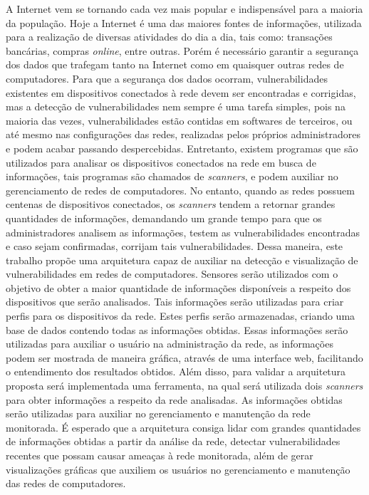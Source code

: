 \begin{resumo}

A Internet vem se tornando cada vez mais popular e indispensável para a maioria da população. Hoje a Internet é uma das maiores fontes de informações, utilizada para a realização de diversas atividades do dia a dia, tais como: transações bancárias, compras \textit{online}, entre outras. Porém  é necessário garantir a segurança dos dados que trafegam tanto na Internet como em quaisquer outras redes de computadores. Para que a segurança dos dados ocorram, vulnerabilidades existentes em dispositivos  conectados à rede devem ser encontradas e corrigidas, mas a detecção de vulnerabilidades nem sempre é uma tarefa simples, pois na maioria das vezes, vulnerabilidades estão contidas em softwares de terceiros, ou até mesmo nas configurações das redes, realizadas pelos próprios administradores e podem acabar passando despercebidas. Entretanto, existem programas que são utilizados para analisar os dispositivos conectados na rede em busca de informações, tais programas são chamados de \textit{scanners}, e podem auxiliar no gerenciamento de redes de computadores. No entanto, quando as redes possuem centenas de dispositivos conectados, os \textit{scanners} tendem a retornar grandes quantidades de informações, demandando um grande tempo para que os administradores analisem as informações, testem as vulnerabilidades encontradas e caso sejam confirmadas, corrijam tais vulnerabilidades.
Dessa maneira, este trabalho propõe uma arquitetura capaz de auxiliar na detecção e visualização de vulnerabilidades em redes de computadores. Sensores serão utilizados com o objetivo de obter a maior quantidade de informações disponíveis a respeito dos dispositivos que serão analisados. Tais informações serão utilizadas para criar perfis para os dispositivos da rede. Estes perfis serão armazenadas, criando uma base de dados contendo todas as informações obtidas. Essas informações serão utilizadas para auxiliar o usuário na administração da rede, as informações podem ser mostrada de maneira gráfica, através de uma interface web, facilitando o entendimento dos resultados obtidos. Além disso, para validar a arquitetura proposta será implementada uma ferramenta, na qual será utilizada dois \textit{scanners} para obter informações a respeito da rede analisadas. As informações obtidas serão utilizadas para auxiliar no gerenciamento e manutenção da rede monitorada. 
É esperado que a arquitetura consiga lidar com grandes quantidades de informações obtidas a partir da análise da rede, detectar vulnerabilidades recentes que possam causar ameaças à rede monitorada, além de gerar visualizações gráficas que auxiliem os usuários no gerenciamento e manutenção das redes de computadores.





\end{resumo}

